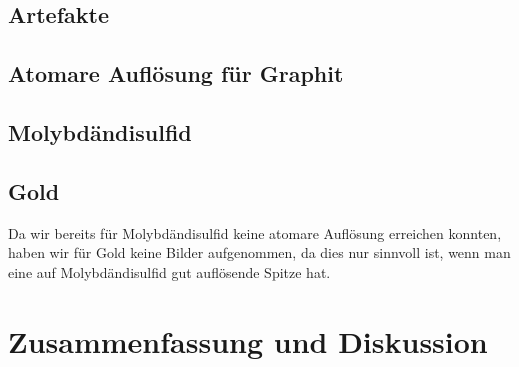 \documentclass[12pt,listof=totoc]{scrartcl}
\newcommand{\code}[1]{\texttt{#1}}
\begin{document}
\subsection{Artefakte}

\subsection{Atomare Auflösung für Graphit}



\subsection{Molybdändisulfid}



\subsection{Gold}

Da wir bereits für Molybdändisulfid keine atomare Auflösung erreichen konnten, haben wir für Gold keine Bilder aufgenommen, da dies nur sinnvoll ist, wenn man eine auf Molybdändisulfid gut auflösende Spitze hat. 

\newpage
\section{Zusammenfassung und Diskussion}
\label{diskussion}








%
%
\end{document}
